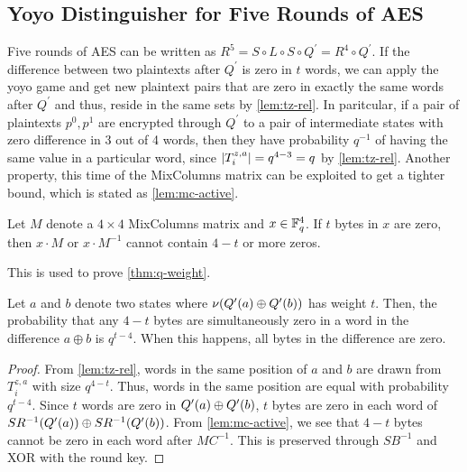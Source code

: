 \documentclass[twoside]{article}
\begin{document}
\subsection{Yoyo Distinguisher for Five Rounds of AES}

Five rounds of AES can be written as \(R^5 = S \circ L \circ S \circ Q^\prime =
R^4 \circ Q^\prime\). If the difference between two plaintexts after
\(Q^\prime\) is zero in \(t\) words, we can apply the yoyo game and get new
plaintext pairs that are zero in exactly the same words after \(Q^\prime\) and
thus, reside in the same sets by \autoref{lem:tz-rel}. In paritcular, if a pair
of plaintexts \(p^0, p^1\) are encrypted through \(Q^\prime\) to a pair of
intermediate states with zero difference in 3 out of 4 words, then they have
probability \(q^{-1}\) of having the same value in a particular word, since
\(\left\vert T_i^{z, a}\right\vert = q^{4 - 3} = q\) by \autoref{lem:tz-rel}. Another property,
this time of the MixColumns matrix can be exploited to get a tighter bound,
which is stated as \autoref{lem:mc-active}.

\begin{lemma}
    \label{lem:mc-active}
    Let \(M\) denote a \(4 \times 4\) MixColumns matrix and \(x \in \mathbb F_q^4\).
    If \(t\) bytes in \(x\) are zero, then \(x \cdot M\) or \(x \cdot M^{-1}\)
    cannot contain \(4 - t\) or more zeros.
\end{lemma}

This is used to prove \autoref{thm:q-weight}.

\begin{theorem}
    \label{thm:q-weight}
    Let \(a\) and \(b\) denote two states where \(\nu(Q^\prime(a)
    \oplus Q^\prime(b))\) has weight \(t\). Then, the probability that any
    \(4 - t\) bytes are simultaneously zero in a word in the difference \(a
    \oplus b\) is \(q^{t - 4}\). When this happens, all bytes in the difference
    are zero.
\end{theorem}
\begin{proof}
    From \autoref{lem:tz-rel}, words in the same position of \(a\) and \(b\) are
    drawn from \(T_i^{z, a}\) with size \(q^{4 - t}\). Thus, words in the same
    position are equal with probability \(q^{t - 4}\). Since \(t\) words are
    zero in \(Q^\prime(a) \oplus Q^\prime(b)\), \(t\) bytes are zero
    in each word of \(SR^{-1}(Q^\prime(a)) \oplus
    SR^{-1}(Q^\prime(b))\). From \autoref{lem:mc-active}, we see that
    \(4 - t\) bytes cannot be zero in each word after \(MC^{-1}\). This is
    preserved through \(SB^{-1}\) and XOR with the round key.
\end{proof}
\end{document}
